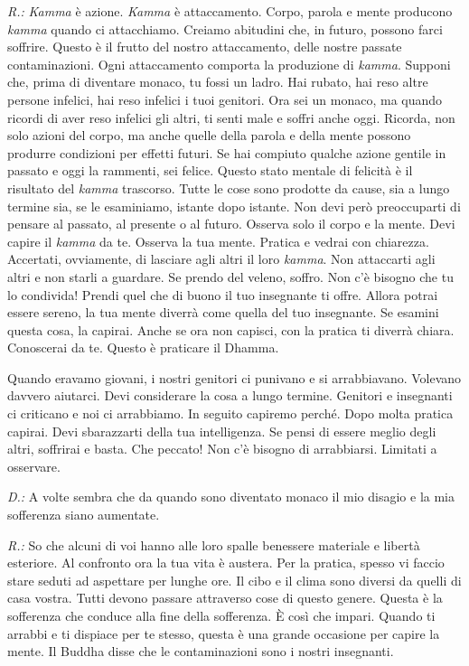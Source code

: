 \emph{R.:} \emph{Kamma} è azione. \emph{Kamma} è attaccamento. Corpo, parola e
mente producono \emph{kamma} quando ci attacchiamo. Creiamo abitudini
che, in futuro, possono farci soffrire. Questo è il frutto del nostro
attaccamento, delle nostre passate contaminazioni. Ogni attaccamento
comporta la produzione di \emph{kamma}. Supponi che, prima di diventare
monaco, tu fossi un ladro. Hai rubato, hai reso altre persone infelici,
hai reso infelici i tuoi genitori. Ora sei un monaco, ma quando ricordi
di aver reso infelici gli altri, ti senti male e soffri anche oggi.
Ricorda, non solo azioni del corpo, ma anche quelle della parola e della
mente possono produrre condizioni per effetti futuri. Se hai compiuto
qualche azione gentile in passato e oggi la rammenti, sei felice. Questo
stato mentale di felicità è il risultato del \emph{kamma} trascorso.
Tutte le cose sono prodotte da cause, sia a lungo termine sia, se le
esaminiamo, istante dopo istante. Non devi però preoccuparti di pensare
al passato, al presente o al futuro. Osserva solo il corpo e la mente.
Devi capire il \emph{kamma} da te. Osserva la tua mente. Pratica e
vedrai con chiarezza. Accertati, ovviamente, di lasciare agli altri il
loro \emph{kamma}. Non attaccarti agli altri e non starli a guardare. Se
prendo del veleno, soffro. Non c'è bisogno che tu lo condivida! Prendi
quel che di buono il tuo insegnante ti offre. Allora potrai essere
sereno, la tua mente diverrà come quella del tuo insegnante. Se esamini
questa cosa, la capirai. Anche se ora non capisci, con la pratica ti
diverrà chiara. Conoscerai da te. Questo è praticare il Dhamma.

Quando eravamo giovani, i nostri genitori ci punivano e si arrabbiavano.
Volevano davvero aiutarci. Devi considerare la cosa a lungo termine.
Genitori e insegnanti ci criticano e noi ci arrabbiamo. In seguito
capiremo perché. Dopo molta pratica capirai. Devi sbarazzarti della tua
intelligenza. Se pensi di essere meglio degli altri, soffrirai e basta.
Che peccato! Non c'è bisogno di arrabbiarsi. Limitati a osservare.

\emph{D.:} A volte sembra che da quando sono diventato monaco il mio disagio e
la mia sofferenza siano aumentate.

\emph{R.:} So che alcuni di voi hanno alle loro spalle benessere materiale e
libertà esteriore. Al confronto ora la tua vita è austera. Per la
pratica, spesso vi faccio stare seduti ad aspettare per lunghe ore. Il
cibo e il clima sono diversi da quelli di casa vostra. Tutti devono
passare attraverso cose di questo genere. Questa è la sofferenza che
conduce alla fine della sofferenza. È così che impari. Quando ti arrabbi
e ti dispiace per te stesso, questa è una grande occasione per capire la
mente. Il Buddha disse che le contaminazioni sono i nostri insegnanti.

